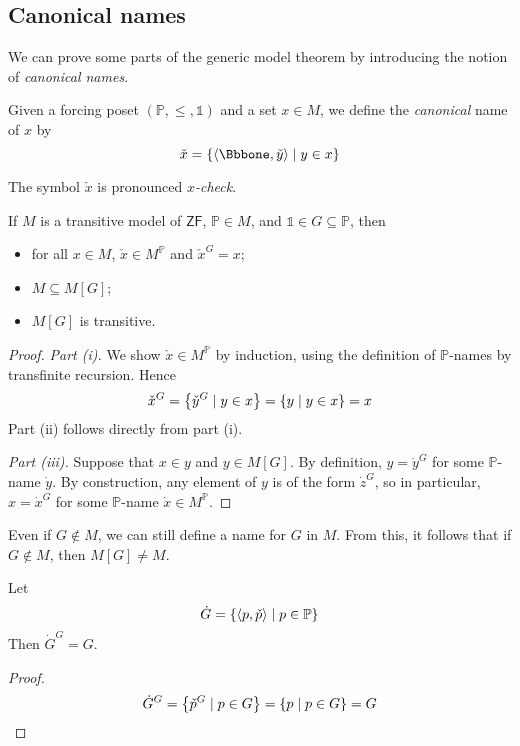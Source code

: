 \subsection{Canonical names}
We can prove some parts of the generic model theorem by introducing the notion of \emph{canonical names}.
\begin{definition}
    Given a forcing poset \( (\mathbb P, \leq, \Bbbone) \) and a set \( x \in M \), we define the \emph{canonical} name of \( x \) by
    \[ \check x = \qty{\langle \Bbbone, \check y \rangle \mid y \in x} \]
\end{definition}
The symbol \( \check x \) is pronounced \emph{\( x \)-check}.
\begin{lemma}
    If \( M \) is a transitive model of \( \mathsf{ZF} \), \( \mathbb P \in M \), and \( \Bbbone \in G \subseteq \mathbb P \), then
    \begin{itemize}
        \item for all \( x \in M \), \( \check x \in M^{\mathbb P} \) and \( \check x^G = x \);
        \item \( M \subseteq M[G] \);
        \item \( M[G] \) is transitive.
    \end{itemize}
\end{lemma}
\begin{proof}
    \emph{Part (i).}
    We show \( \check x \in M^{\mathbb P} \) by induction, using the definition of \( \mathbb P \)-names by transfinite recursion.
    Hence
    \[ \check x^G = \qty{\check y^G \mid y \in x} = \qty{y \mid y \in x} = x \]
    Part (ii) follows directly from part (i).

    \emph{Part (iii).}
    Suppose that \( x \in y \) and \( y \in M[G] \).
    By definition, \( y = \dot y^G \) for some \( \mathbb P \)-name \( \dot y \).
    By construction, any element of \( y \) is of the form \( \dot z^G \), so in particular, \( x = \dot x^G \) for some \( \mathbb P \)-name \( \dot x \in M^{\mathbb P} \).
\end{proof}
\begin{remark}
    Even if \( G \notin M \), we can still define a name for \( G \) in \( M \).
    From this, it follows that if \( G \notin M \), then \( M[G] \neq M \).
\end{remark}
\begin{proposition}
    Let
    \[ \dot G = \qty{\langle p, \check p \rangle \mid p \in \mathbb P} \]
    Then \( \dot G^G = G \).
\end{proposition}
\begin{proof}
    \[ \dot G^G = \qty{\check p^G \mid p \in G} = \qty{p \mid p \in G} = G \]
\end{proof}

